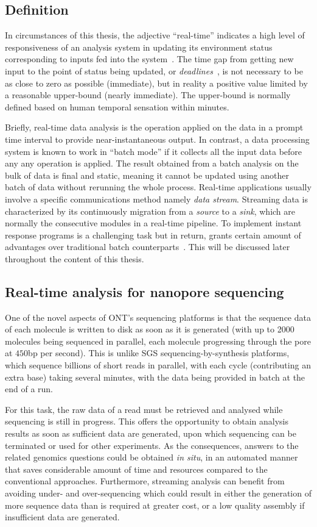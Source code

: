 \subsection{Definition}
In circumstances of this thesis, the adjective ``real-time'' indicates  a high level of responsiveness of an analysis system in updating its environment status corresponding to inputs fed into the system~\cite{Phillips1966programming}.
The time gap from getting new input to the point of status being updated, or \emph{deadlines}~\cite{Ben2006principles}, is not necessary to be as close to zero as possible (immediate), but in reality a positive value limited by a reasonable upper-bound (nearly immediate).
The upper-bound is normally defined based on human temporal sensation \EG{} within minutes.

Briefly, real-time data analysis is the operation applied on the data in a prompt time interval to provide near-instantaneous output.
In contrast, a data processing system is known to work in ``batch mode'' if it collects all the input data before any any operation is applied. 
The result obtained from a batch analysis on the bulk of data is final and static, meaning it cannot be updated using another batch of data without rerunning the whole process.
Real-time applications usually involve a specific communications method namely \emph{data stream}. Streaming data is characterized by its continuously migration from a \emph{source} to a \emph{sink}, which are normally the consecutive modules in a real-time pipeline.
To implement instant response programs is a challenging task but in return, grants certain amount of advantages over traditional batch counterparts~\cite{Croushore2011frontiers}. 
This will be discussed later throughout the content of this thesis.
\subsection{Real-time analysis for nanopore sequencing}
One of the novel aspects of ONT's sequencing platforms is that the sequence data of each molecule is written to disk as soon as it is generated (with up to 2000 molecules being sequenced in parallel, each molecule progressing through the pore at $450$bp per second).    This is unlike SGS sequencing-by-synthesis platforms, which sequence billions of short reads in parallel, with each cycle (contributing an extra base) taking several minutes, with the data being provided in batch at the end of a run.

For this task, the raw data of a read must be retrieved and analysed while sequencing is still in progress. This offers the opportunity to obtain analysis results as soon as sufficient data are generated, upon which sequencing can be terminated or used for other experiments.
As the consequences, answers to the related genomics questions could be obtained \emph{in situ}, in an automated manner that saves considerable amount of time and resources compared to the conventional approaches.
Furthermore, streaming analysis can benefit from avoiding under- and over-sequencing which could result in either the generation of more sequence data than is required at greater cost, or a low quality assembly if insufficient data are generated. 

